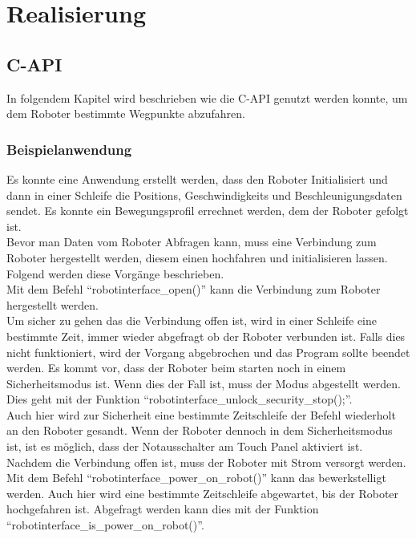 \chapter{Realisierung}
\label{chap:umsetzung}

\section{C-API}
\label{sec:capi_rel}

In folgendem Kapitel wird beschrieben wie die C-API genutzt werden konnte, um dem Roboter bestimmte Wegpunkte abzufahren.

\subsection{Beispielanwendung}
\label{sub:capi-problems_rel}

Es konnte eine Anwendung erstellt werden, dass den Roboter Initialisiert und dann in einer Schleife die Positions, Geschwindigkeits und Beschleunigungsdaten sendet. Es konnte ein Bewegungsprofil errechnet werden, dem der Roboter gefolgt ist. 
\\
Bevor man Daten vom Roboter Abfragen kann, muss eine Verbindung zum Roboter hergestellt werden, diesem einen hochfahren und initialisieren lassen. Folgend werden diese Vorgänge beschrieben.\\
Mit dem Befehl ``robotinterface\_open()'' kann die Verbindung zum Roboter hergestellt werden.
\\
Um sicher zu gehen das die Verbindung offen ist, wird in einer Schleife eine bestimmte Zeit, immer wieder abgefragt ob der Roboter verbunden ist. Falls dies nicht funktioniert, wird der Vorgang abgebrochen und das Program sollte beendet werden. Es kommt vor, dass der Roboter beim starten noch in einem Sicherheitsmodus ist. Wenn dies der Fall ist, muss der Modus abgestellt werden. Dies geht mit der Funktion ``robotinterface\_unlock\_security\_stop();''.
\\
Auch hier wird zur Sicherheit eine bestimmte Zeitschleife der Befehl wiederholt an den Roboter gesandt. Wenn der Roboter dennoch in dem Sicherheitsmodus ist, ist es möglich, dass der Notausschalter am Touch Panel aktiviert ist.
Nachdem die Verbindung offen ist, muss der Roboter mit Strom versorgt werden. Mit dem Befehl ``robotinterface\_power\_on\_robot()'' kann das bewerkstelligt werden. Auch hier wird eine bestimmte Zeitschleife abgewartet, bis der Roboter hochgefahren ist. Abgefragt werden kann dies mit der Funktion ``robotinterface\_is\_power\_on\_robot()''.

